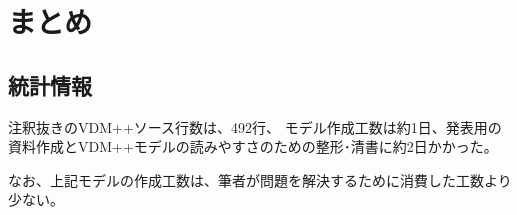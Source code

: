 \section{まとめ}
\subsection{統計情報}
注釈抜きのVDM++ソース行数は、492行、
モデル作成工数は約1日、発表用の資料作成とVDM++モデルの読みやすさのための整形･清書に約2日かかった。

なお、上記モデルの作成工数は、筆者が問題を解決するために消費した工数より少ない。